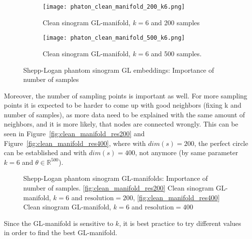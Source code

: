 \begin{figure}[H]
    \captionsetup[subfigure]{justification=centering}
    \centering
    \begin{subfigure}[t]{0.45\textwidth}
        \texttt{[image: phaton\_clean\_manifold\_200\_k6.png]}
        \caption{Clean sinogram GL-manifold, $k = 6$ and 200 samples}
        \label{fig:clean_manifold_200}
    \end{subfigure}\hfill
    \begin{subfigure}[t]{0.45\textwidth}
      \texttt{[image: phaton\_clean\_manifold\_500\_k6.png]}
      \caption{Clean sinogram GL-manifold, $k = 6$ and 500 samples.}
      \label{fig:clean_manifold_500}
    \end{subfigure}\hfill
    \caption{Shepp-Logan phantom sinogram GL embeddings: Importance of number of samples}
  \end{figure}


Moreover, the number of sampling points is important as well.
For more sampling points it is expected to be harder to come up with good neighbors (fixing k and number of samples),
as more data need to be explained with the same amount of neighbors, and it is more likely, that nodes are connected wrongly.
This can be seen in Figure~\ref{fig:clean_manifold_res200} and Figure~\ref{fig:clean_manifold_res400}, where with $dim(s) = 200$,
the perfect circle can be established and with $dim(s) = 400$, not anymore (by same parameter $k = 6$ and $\theta \in \mathbb{R}^{500}$).

\begin{figure}[H]
    \centering
    \hfill
    \hfill
    \hfill
    \caption{Shepp-Logan phantom sinogram GL-manifolds: Importance of number of samples.
    \ref{fig:clean_manifold_res200} Clean sinogram GL-manifold, $k = 6$ and $\text{resolution}=200$,
    \ref{fig:clean_manifold_res400} Clean sinogram GL-manifold, $k = 6$ and $\text{resolution}=400$}
\end{figure}


\begin{tcolorbox}[colback=red!5!white,colframe=red!75!black]
    Since the GL-manifold is sensitive to $k$, it is best practice to try different values in order to find the best GL-manifold.
\end{tcolorbox}





